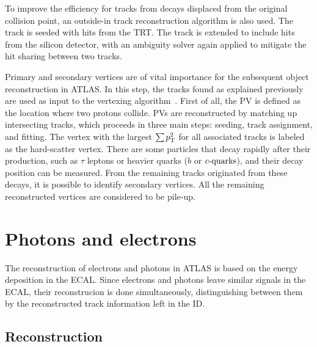 To improve the efficiency for tracks from decays displaced from the original collision point, an outside-in track reconstruction algorithm is also used. The track is seeded with hits from the \ac{TRT}. The track is extended to include hits from the silicon detector, with an ambiguity solver again applied to mitigate the hit sharing between two tracks.

Primary and secondary vertices are of vital importance for the subsequent object reconstruction in \ac{ATLAS}. In this step, the tracks found as explained previously are used as input to the vertexing algorithm~\cite{ATLAS-PVReconstruction,ATLAS-VertexReconstruction}. First of all, the \ac{PV} is defined as the location where two protons collide. \acp{PV} are reconstructed by matching up intersecting tracks, which proceeds in three main steps: seeding, track assignment, and fitting. The vertex with the largest \(\sum p_{\text{T}}^2\) for all associated tracks is labeled as the hard-scatter vertex. There are some particles that decay rapidly after their production, such as \(\tau\) leptons or heavier quarks (\(b\) or \(c\text{-quarks}\)), and their decay position can be measured. From the remaining tracks originated from these decays, it is possible to identify secondary vertices. All the remaining reconstructed vertices are considered to be pile-up.








\section{Photons and electrons}

The reconstruction of electrons and photons in \ac{ATLAS} is based on the energy deposition in the \ac{ECAL}. Since electrons and photons leave similar signals in the \ac{ECAL}, their reconstrucion is done simultaneously, distinguishing between them by the reconstructed track information left in the \ac{ID}.


\subsection{Reconstruction}
\label{subsec:objects:egamma:reco}

